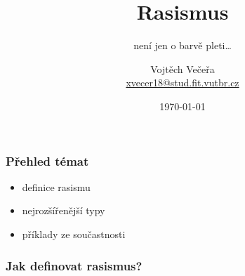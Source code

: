 \documentclass{beamer}
\begin{document}
\title{Rasismus}
\subtitle{není jen o barvě pleti\dots} 
\author[Vojtěch Večeřa]{Vojtěch Večeřa\\\url{xvecer18@stud.fit.vutbr.cz}}
\date{\today}
\frame{\titlepage}

\begin{frame}
\transwipe
{}
\frametitle{Přehled témat}
\begin{itemize}
\item definice rasismu
\item nejrozšířenější typy
\item příklady ze součastnosti
\end{itemize}
\end{frame}


\begin{frame}
\transwipe
{}
\frametitle{Jak definovat rasismus?}
\begin{columns}
\begin{column}{0.6\textwidth}
\begin{itemize}
\end{itemize}
\end{column}

\begin{column}{0.4\textwidth}
\end{column}
\end{columns}
\end{frame}
\end{document}
